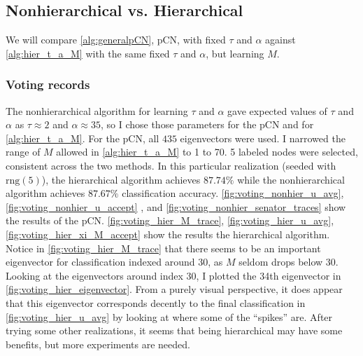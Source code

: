 \documentclass{siamart1116}
\begin{document}
    \subsection{Nonhierarchical vs. Hierarchical}
        We will compare \cref{alg:generalpCN}, pCN, with fixed $\tau$ and $\alpha$ against \cref{alg:hier_t_a_M} with the same fixed $\tau$ and $\alpha$, but learning $M$.
        \subsubsection{Voting records}
            The nonhierarchical algorithm for learning $\tau$ and $\alpha$ gave expected values of $\tau$ and $\alpha$ as $\tau \approx 2$ and $\alpha \approx 35$, so I chose those parameters for the pCN and for \cref{alg:hier_t_a_M}. For the pCN, all $435$ eigenvectors were used. I narrowed the range of $M$ allowed in \cref{alg:hier_t_a_M} to 1 to 70. 5 labeled nodes were selected, consistent across the two methods. In this particular realization (seeded with $\text{rng}(5)$), the hierarchical algorithm achieves $87.74\%$ while the nonhierarchical algorithm achieves $87.67\%$ classification accuracy. \cref{fig:voting_nonhier_u_avg}, \cref{fig:voting_nonhier_u_accept} , and \cref{fig:voting_nonhier_senator_traces} show the results of the pCN. \cref{fig:voting_hier_M_trace}, \cref{fig:voting_hier_u_avg}, \cref{fig:voting_hier_xi_M_accept} show the results the hierarchical algorithm. Notice in \cref{fig:voting_hier_M_trace} that there seems to be an important eigenvector for classification indexed around 30, as $M$ seldom drops below $30$. Looking at the eigenvectors around index 30, I plotted the 34th eigenvector in \cref{fig:voting_hier_eigenvector}. From a purely visual perspective, it does appear that this eigenvector corresponds decently to the final classification in \cref{fig:voting_hier_u_avg} by looking at where some of the ``spikes'' are. After trying some other realizations, it seems that being hierarchical may have some benefits, but more experiments are needed.
\end{document}
